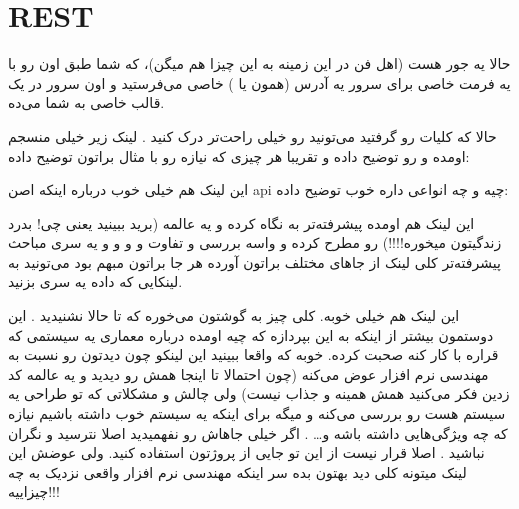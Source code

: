 \documentclass[]{article}
\begin{document}
\section*{{\titr REST}}
حالا  یه جور  هست (اهل فن در این زمینه به این چیزا  هم میگن)، که شما طبق اون  رو با یه فرمت خاصی برای سرور یه آدرس (همون  یا ) خاصی می‌فرستید و اون سرور در یک قالب خاصی به شما  می‌ده. 

حالا که کلیات رو گرفتید می‌تونید  رو خیلی راحت‌تر درک کنید . لینک زیر خیلی منسجم اومده  و  رو توضیح داده و تقریبا هر چیزی که نیازه رو با مثال براتون توضیح داده:

\begin{flushleft}
\href{https://www.smashingmagazine.com/2018/01/understanding-using-rest-api/}{\textcolor{blue}{\underline{}}}
\end{flushleft}

این لینک هم خیلی خوب درباره اینکه اصن api چیه و چه انواعی داره خوب توضیح داده:

\begin{flushleft}
\href{https://www.moesif.com/blog/api-guide/getting-started-with-apis/}{\textcolor{blue}{\underline{}}}
\end{flushleft}

این لینک هم اومده پیشرفته‌تر به  نگاه کرده و یه عالمه  (برید ببینید یعنی چی! بدرد زندگیتون میخوره!!!!) رو مطرح کرده و واسه بررسی  و تفاوت  و  و  و  و یه سری مباحث پیشرفته‌تر کلی لینک از جاهای مختلف براتون آورده هر جا براتون مبهم بود می‌تونید به لینکایی که داده یه سری بزنید.

\begin{flushleft}
\href{https://www.moesif.com/blog/api-guide/api-design-guidelines/}{\textcolor{blue}{\underline{}}}
\end{flushleft}

این لینک هم خیلی خوبه. کلی چیز به گوشتون می‌خوره که تا حالا نشنیدید . این دوستمون بیشتر از اینکه به این بپردازه که  چیه اومده درباره معماری یه سیستمی که قراره با  کار کنه صحبت کرده. خوبه که واقعا ببینید این لینکو چون دیدتون رو نسبت به مهندسی نرم افزار عوض می‌کنه (چون احتمالا تا اینجا همش  رو دیدید و یه عالمه کد زدین فکر می‌کنید همش همینه و جذاب نیست) ولی چالش و مشکلاتی که تو طراحی یه سیستم  هست رو بررسی می‌کنه و میگه برای اینکه یه سیستم خوب داشته باشیم نیازه که چه ویژگی‌هایی داشته باشه و… . اگر خیلی جاهاش رو نفهمیدید اصلا نترسید و نگران نباشید . اصلا قرار نیست از این تو جایی از پروژتون استفاده کنید. ولی عوضش این لینک میتونه کلی دید بهتون بده سر اینکه مهندسی نرم افزار واقعی نزدیک به چه چیزاییه!!!
\end{document}
